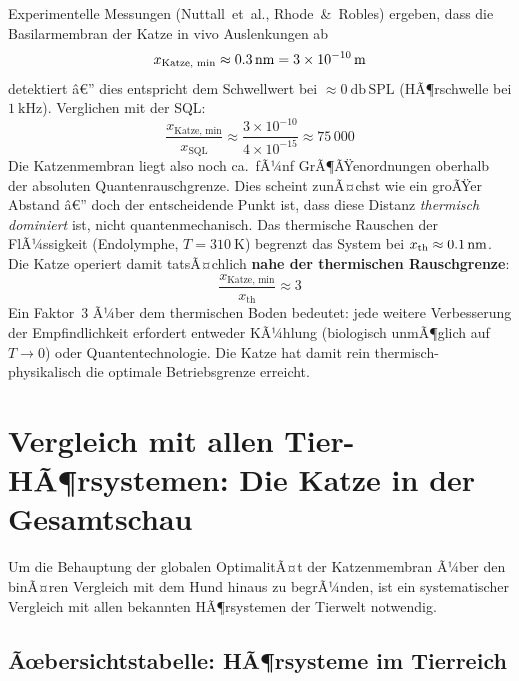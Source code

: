 ﻿\documentclass[12pt,a4paper,titlepage]{report}
\begin{document}
Experimentelle Messungen (Nuttall~et~al., Rhode~\&~Robles) ergeben, dass die
Basilarmembran der Katze in vivo Auslenkungen ab
\[
  x_{\text{Katze, min}} \approx \SI{0{,}3}{\nano\meter} = \SI{3e-10}{\meter}
\]
detektiert â€” dies entspricht dem Schwellwert bei $\approx \SI{0}{\decibel}\,\text{SPL}$
(HÃ¶rschwelle bei $\SI{1}{\kilo\hertz}$). Verglichen mit der SQL:
\[
  \frac{x_{\text{Katze, min}}}{x_{\mathrm{SQL}}} \approx \frac{3\times10^{-10}}{4\times10^{-15}} \approx 75\,000
\]
Die Katzenmembran liegt also noch ca.\ fÃ¼nf GrÃ¶ÃŸenordnungen oberhalb der
absoluten Quantenrauschgrenze.
Dies scheint zunÃ¤chst wie ein groÃŸer Abstand â€” doch der entscheidende Punkt ist,
dass diese Distanz \emph{thermisch dominiert} ist, nicht quantenmechanisch.
Das thermische Rauschen der FlÃ¼ssigkeit (Endolymphe, $T = \SI{310}{\kelvin}$)
begrenzt das System bei $x_{\text{th}} \approx \SI{0{,}1}{\nano\meter}$.
Die Katze operiert damit tatsÃ¤chlich \textbf{nahe der thermischen Rauschgrenze}:
\[
  \frac{x_{\text{Katze, min}}}{x_{\text{th}}} \approx 3
\]
Ein Faktor~3 Ã¼ber dem thermischen Boden bedeutet: jede weitere Verbesserung
der Empfindlichkeit erfordert entweder KÃ¼hlung (biologisch unmÃ¶glich auf
$T \to 0$) oder Quantentechnologie. Die Katze hat damit rein thermisch-physikalisch
die optimale Betriebsgrenze erreicht.

\section{Vergleich mit allen Tier-HÃ¶rsystemen: Die Katze in der Gesamtschau}
\label{sec:tierwelt}

Um die Behauptung der globalen OptimalitÃ¤t der Katzenmembran Ã¼ber den binÃ¤ren
Vergleich mit dem Hund hinaus zu begrÃ¼nden, ist ein systematischer Vergleich mit
allen bekannten HÃ¶rsystemen der Tierwelt notwendig.

\subsection{Ãœbersichtstabelle: HÃ¶rsysteme im Tierreich}
\end{document}
